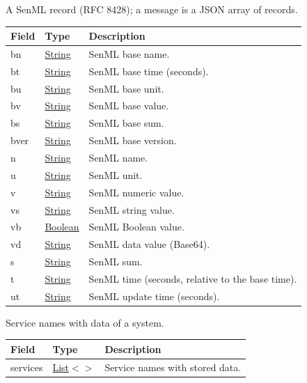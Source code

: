 \documentclass[a4paper]{arrowhead}
\newcommand{\pref}[1]{{\textcolor{ArrowheadGrey}{\hyperref[sec:model:primitives:#1]{#1}}}}
\begin{document}

A SenML record (RFC 8428); a message is a JSON array of records.


\noindent\begin{tabularx}{\textwidth}{| >{\raggedright\arraybackslash}p{3.9cm} | >{\raggedright\arraybackslash\small}p{5.3cm} | X |} \hline
\rowcolor{gray!33} Field & Type & Description \\ \hline
bn & \pref{String} & SenML base name. \\ \hline
bt & \pref{String} & SenML base time (seconds). \\ \hline
bu & \pref{String} & SenML base unit. \\ \hline
bv & \pref{String} & SenML base value. \\ \hline
bs & \pref{String} & SenML base sum. \\ \hline
bver & \pref{String} & SenML base version. \\ \hline
n & \pref{String} & SenML name. \\ \hline
u & \pref{String} & SenML unit. \\ \hline
v & \pref{String} & SenML numeric value. \\ \hline
vs & \pref{String} & SenML string value. \\ \hline
vb & \pref{Boolean} & SenML Boolean value. \\ \hline
vd & \pref{String} & SenML data value (Base64). \\ \hline
s & \pref{String} & SenML sum. \\ \hline
t & \pref{String} & SenML time (seconds, relative to the base time). \\ \hline
ut & \pref{String} & SenML update time (seconds). \\ \hline
\end{tabularx}




Service names with data of a system.


\noindent\begin{tabularx}{\textwidth}{| >{\raggedright\arraybackslash}p{3.9cm} | >{\raggedright\arraybackslash\small}p{5.3cm} | X |} \hline
\rowcolor{gray!33} Field & Type & Description \\ \hline
services & \pref{List}$<$\allowbreak{}\pref{String}$>$ & Service names with stored data. \\ \hline
\end{tabularx}
\end{document}
